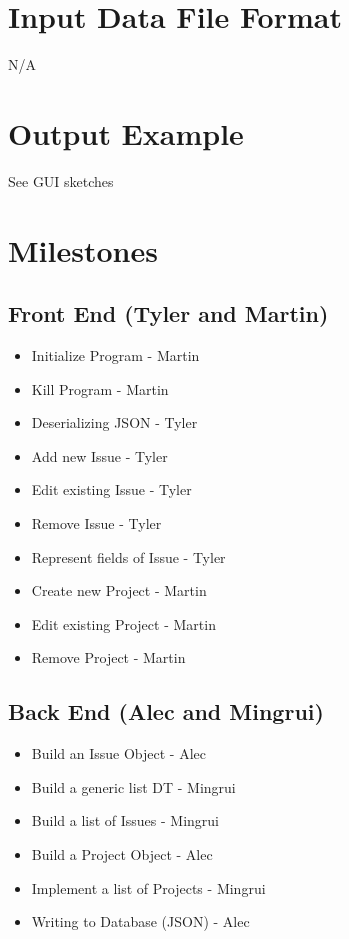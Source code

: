 \documentclass{article}
\begin{document}
\section{Input Data File Format}

    N/A

\section{Output Example}

    See GUI sketches

\section{Milestones}

    \subsection{Front End (Tyler and Martin)}

        \begin{itemize}
            \item Initialize Program                - Martin
            \item Kill Program                      - Martin
            \item Deserializing JSON                - Tyler
            \item Add new Issue                     - Tyler
            \item Edit existing Issue               - Tyler
            \item Remove Issue                      - Tyler
            \item Represent fields of Issue         - Tyler
            \item Create new Project                - Martin
            \item Edit existing Project             - Martin
            \item Remove Project                    - Martin
        \end{itemize}

    \subsection{Back End (Alec and Mingrui)}

        \begin{itemize}
            \item Build an Issue Object             - Alec
            \item Build a generic list DT           - Mingrui
            \item Build a list of Issues            - Mingrui
            \item Build a Project Object            - Alec
            \item Implement a list of Projects      - Mingrui
            \item Writing to Database (JSON)        - Alec
        \end{itemize}
\end{document}

